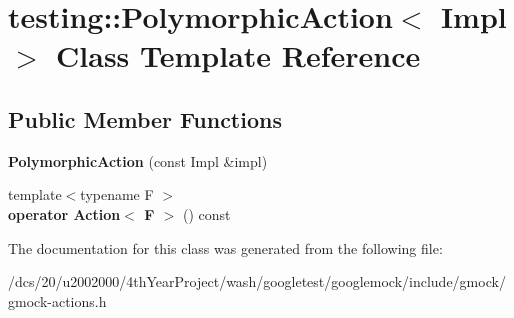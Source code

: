 \hypertarget{classtesting_1_1PolymorphicAction}{}\section{testing\+:\+:Polymorphic\+Action$<$ Impl $>$ Class Template Reference}
\label{classtesting_1_1PolymorphicAction}
\subsection*{Public Member Functions}
\begin{DoxyCompactItemize}
\item 
\mbox{\label{classtesting_1_1PolymorphicAction_a062e5a45ad61dcf8085b15cc882ca0ae}} 
{\bfseries Polymorphic\+Action} (const Impl \&impl)
\item 
\mbox{\label{classtesting_1_1PolymorphicAction_ac35461616cc15c06f1a2f9ee1c03fb8f}} 
{\footnotesize template$<$typename F $>$ }\\{\bfseries operator Action$<$ F $>$} () const
\end{DoxyCompactItemize}


The documentation for this class was generated from the following file\+:\begin{DoxyCompactItemize}
\item 
/dcs/20/u2002000/4th\+Year\+Project/wash/googletest/googlemock/include/gmock/gmock-\/actions.\+h\end{DoxyCompactItemize}
